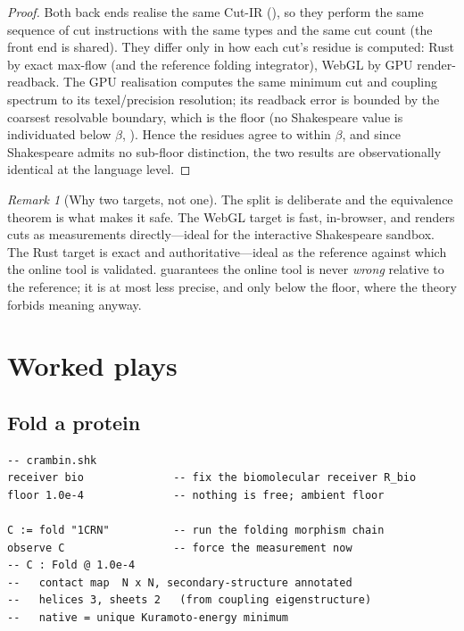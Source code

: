 \documentclass[11pt,a4paper]{article}
\theoremstyle{thmstyle}
\theoremstyle{definition}
\theoremstyle{remark}
\newtheorem{remark}[theorem]{Remark}
\newcommand{\flo}{\beta}
\begin{document}
\begin{proof}
Both back ends realise the same Cut-IR (), so they perform the
same sequence of cut instructions with the same types and the same cut
count (the front end is shared). They differ only in how each cut's residue
is computed: Rust by exact max-flow (and the reference folding
integrator), WebGL by GPU render-readback. The GPU realisation computes the
same minimum cut and coupling spectrum to its texel/precision resolution;
its readback error is bounded by the coarsest resolvable boundary, which is
the floor (no Shakespeare value is individuated below $\flo$,
). Hence the residues agree to within $\flo$, and
since Shakespeare admits no sub-floor distinction, the two results are
observationally identical at the language level.
\end{proof}

\begin{remark}[Why two targets, not one]
\label{rem:two-targets}
The split is deliberate and the equivalence theorem is what makes it safe.
The WebGL target is fast, in-browser, and renders cuts as measurements
directly---ideal for the interactive Shakespeare sandbox. The Rust target
is exact and authoritative---ideal as the reference against which the online
tool is validated.  guarantees the online tool is
never \emph{wrong} relative to the reference; it is at most less precise,
and only below the floor, where the theory forbids meaning anyway.
\end{remark}

\section{Worked plays}
\label{sec:examples}

\subsection{Fold a protein}

\begin{lstlisting}[caption={Folding crambin (a closure of residue-leaf cuts).}]
-- crambin.shk
receiver bio              -- fix the biomolecular receiver R_bio
floor 1.0e-4              -- nothing is free; ambient floor

C := fold "1CRN"          -- run the folding morphism chain
observe C                 -- force the measurement now
-- C : Fold @ 1.0e-4
--   contact map  N x N, secondary-structure annotated
--   helices 3, sheets 2   (from coupling eigenstructure)
--   native = unique Kuramoto-energy minimum
\end{lstlisting}
\end{document}
